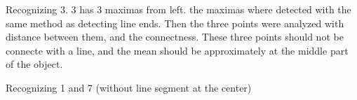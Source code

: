 \documentclass[conference]{IEEEtran}
\begin{document}
Recognizing 3. 3 has 3 maximas from left. the maximas where detected with the same method as detecting line ends. Then the three points were analyzed with distance between them, and the connectness. These three points should not be connecte with a line, and the mean should be approximately at the middle part of the object.

Recognizing 1 and 7 (without line segment at the center)

\end{document}

